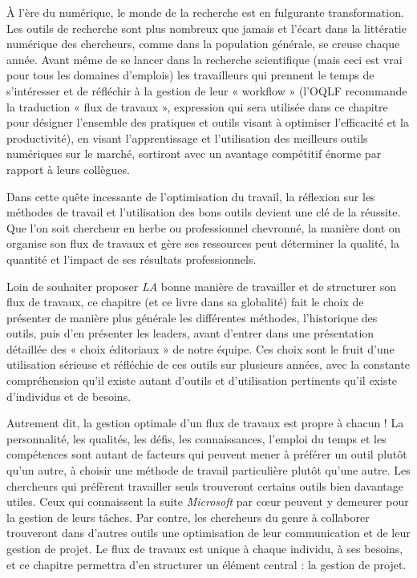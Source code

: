 \documentclass[
  letterpaper,
  DIV=11,
  numbers=noendperiod,
  oneside]{scrreprt}
\begin{document}
À l'ère du numérique, le monde de la recherche est en fulgurante
transformation. Les outils de recherche sont plus nombreux que jamais et
l'écart dans la littératie numérique des chercheurs, comme dans la
population générale, se creuse chaque année. Avant même de se lancer
dans la recherche scientifique (mais ceci est vrai pour tous les
domaines d'emplois) les travailleurs qui prennent le temps de
s'intéresser et de réfléchir à la gestion de leur « workflow » (l'OQLF
recommande la traduction « flux de travaux », expression qui sera
utilisée dans ce chapitre pour désigner l'ensemble des pratiques et
outils visant à optimiser l'efficacité et la productivité), en visant
l'apprentissage et l'utilisation des meilleurs outils numériques sur le
marché, sortiront avec un avantage compétitif énorme par rapport à leurs
collègues.

Dans cette quête incessante de l'optimisation du travail, la réflexion
sur les méthodes de travail et l'utilisation des bons outils devient une
clé de la réussite. Que l'on soit chercheur en herbe ou professionnel
chevronné, la manière dont on organise son flux de travaux et gère ses
ressources peut déterminer la qualité, la quantité et l'impact de ses
résultats professionnels.

Loin de souhaiter proposer \emph{LA} bonne manière de travailler et de
structurer son flux de travaux, ce chapitre (et ce livre dans sa
globalité) fait le choix de présenter de manière plus générale les
différentes méthodes, l'historique des outils, puis d'en présenter les
leaders, avant d'entrer dans une présentation détaillée des « choix
éditoriaux » de notre équipe. Ces choix sont le fruit d'une utilisation
sérieuse et réfléchie de ces outils sur plusieurs années, avec la
constante compréhension qu'il existe autant d'outils et d'utilisation
pertinents qu'il existe d'individus et de besoins.

Autrement dit, la gestion optimale d'un flux de travaux est propre à
chacun ! La personnalité, les qualités, les défis, les connaissances,
l'emploi du temps et les compétences sont autant de facteurs qui peuvent
mener à préférer un outil plutôt qu'un autre, à choisir une méthode de
travail particulière plutôt qu'une autre. Les chercheurs qui préfèrent
travailler seuls trouveront certains outils bien davantage utiles. Ceux
qui connaissent la suite \emph{Microsoft} par cœur peuvent y demeurer
pour la gestion de leurs tâches. Par contre, les chercheurs du genre à
collaborer trouveront dans d'autres outils une optimisation de leur
communication et de leur gestion de projet. Le flux de travaux est
unique à chaque individu, à ses besoins, et ce chapitre permettra d'en
structurer un élément central : la gestion de projet.
\end{document}
